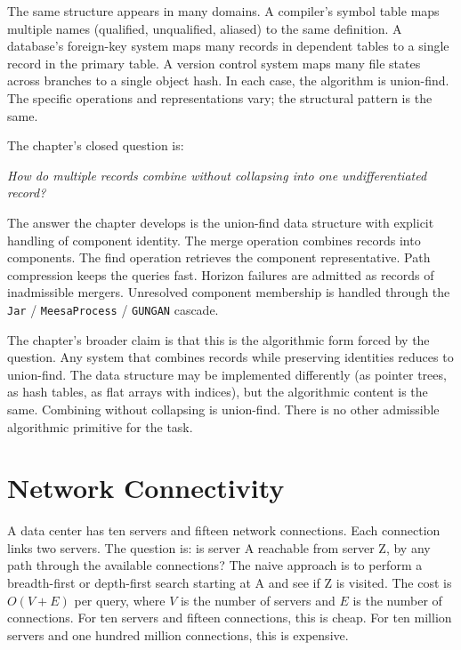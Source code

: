 \begin{chapteressay}
The same structure appears in many domains. A compiler's symbol
table maps multiple names (qualified, unqualified, aliased) to the
same definition. A database's foreign-key system maps many records
in dependent tables to a single record in the primary table. A
version control system maps many file states across branches to a
single object hash. In each case, the algorithm is union-find. The
specific operations and representations vary; the structural
pattern is the same.

The chapter's closed question is:

\begin{center}
\emph{How do multiple records combine without collapsing into one
undifferentiated record?}
\end{center}

The answer the chapter develops is the union-find data structure
with explicit handling of component identity. The merge operation
combines records into components. The find operation retrieves the
component representative. Path compression keeps the queries fast.
Horizon failures are admitted as records of inadmissible mergers.
Unresolved component membership is handled through the
\texttt{Jar} / \texttt{MeesaProcess} / \texttt{GUNGAN} cascade.

The chapter's broader claim is that this is the algorithmic form
forced by the question. Any system that combines records while
preserving identities reduces to union-find. The data structure may
be implemented differently (as pointer trees, as hash tables, as
flat arrays with indices), but the algorithmic content is the same.
Combining without collapsing is union-find. There is no other
admissible algorithmic primitive for the task.

\end{chapteressay}

\section{Network Connectivity}
\label{se:network-connectivity}

A data center has ten servers and fifteen network connections. Each
connection links two servers. The question is: is server A reachable
from server Z, by any path through the available connections? The naive
approach is to perform a breadth-first or depth-first search starting at
A and see if Z is visited. The cost is $O(V + E)$ per query, where $V$
is the number of servers and $E$ is the number of connections. For ten
servers and fifteen connections, this is cheap. For ten million servers
and one hundred million connections, this is expensive.

